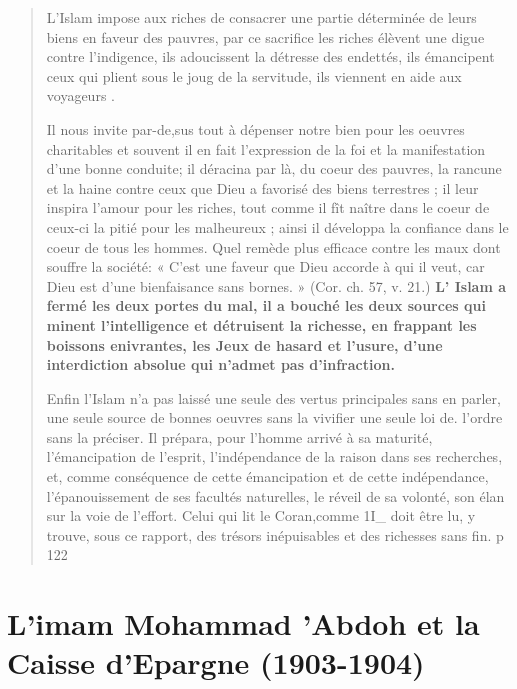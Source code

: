 \begin{quote}
L'Islam impose aux riches de consacrer une partie déterminée de leurs biens en faveur des pauvres, par ce sacrifice les riches élèvent une digue contre l'indigence, ils adoucissent la détresse des endettés, ils émancipent ceux qui plient sous le joug de la servitude, ils viennent en
aide aux voyageurs .
 
Il nous invite par-de,sus tout à dépenser notre bien pour les oeuvres
charitables et souvent il en fait l'expression de la foi et la manifestation
d'une bonne conduite; il déracina par là, du coeur des pauvres, la rancune
et la haine contre ceux que Dieu a favorisé des biens terrestres ; il leur
inspira l'amour pour les riches, tout comme il fît naître dans le coeur de
ceux-ci la pitié pour les malheureux ; ainsi il développa la confiance dans
le coeur de tous les hommes. Quel remède plus efficace contre les maux
dont souffre la société: « C'est une faveur que Dieu accorde à qui il veut,
car Dieu est d'une bienfaisance sans bornes. » (Cor. ch. 57, v. 21.)
\textbf{L' Islam a fermé les deux portes du mal, il a bouché les deux sources
qui minent l'intelligence et détruisent la richesse, en frappant les boissons
enivrantes, les Jeux de hasard et l'usure, d'une interdiction absolue qui
n'admet pas d'infraction.}

Enfin l'Islam n'a pas laissé une seule des vertus principales sans
en parler, une seule source de bonnes oeuvres sans la vivifier une seule
loi de. l'ordre sans la préciser. Il prépara, pour l'homme arrivé à sa
maturité, l'émancipation de l'esprit, l'indépendance de la raison dans
ses recherches, et, comme conséquence de cette émancipation et de
cette indépendance, l'épanouissement de ses facultés naturelles, le réveil
de sa volonté, son élan sur la voie de l'effort. Celui qui lit le Coran,comme
1I_ doit être lu, y trouve, sous ce rapport, des trésors inépuisables et des
richesses sans fin.
p 122

\end{quote}


\section{L'imam Mohammad 'Abdoh et la Caisse d'Epargne (1903-1904)}

